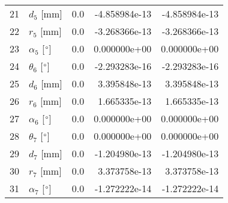 \documentclass{standalone}%
\begin{document}
\begin{tabular}{llrrr}
21 &              $d_{5}$ [mm] &      0.0 & -4.858984e-13 & -4.858984e-13 \\
22 &              $r_{5}$ [mm] &      0.0 & -3.268366e-13 & -3.268366e-13 \\
23 &  $\alpha_{5}$ [$\degree$] &      0.0 &  0.000000e+00 &  0.000000e+00 \\
24 &  $\theta_{6}$ [$\degree$] &      0.0 & -2.293283e-16 & -2.293283e-16 \\
25 &              $d_{6}$ [mm] &      0.0 &  3.395848e-13 &  3.395848e-13 \\
26 &              $r_{6}$ [mm] &      0.0 &  1.665335e-13 &  1.665335e-13 \\
27 &  $\alpha_{6}$ [$\degree$] &      0.0 &  0.000000e+00 &  0.000000e+00 \\
28 &  $\theta_{7}$ [$\degree$] &      0.0 &  0.000000e+00 &  0.000000e+00 \\
29 &              $d_{7}$ [mm] &      0.0 & -1.204980e-13 & -1.204980e-13 \\
30 &              $r_{7}$ [mm] &      0.0 &  3.373758e-13 &  3.373758e-13 \\
31 &  $\alpha_{7}$ [$\degree$] &      0.0 & -1.272222e-14 & -1.272222e-14 \\
\bottomrule
\end{tabular}
%
\end{document}

